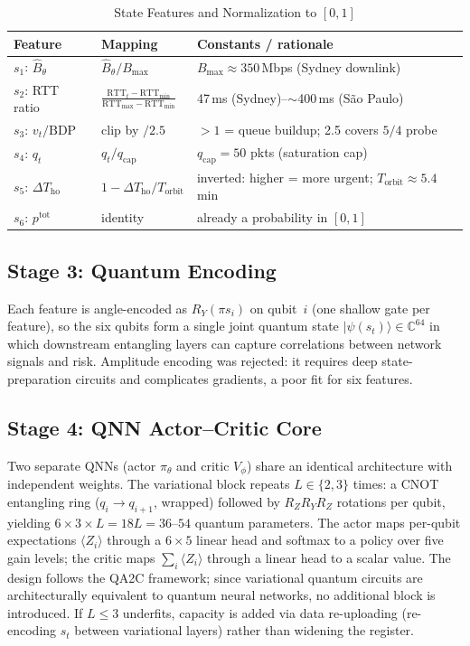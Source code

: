 \documentclass[journal]{IEEEtran}
\begin{document}
\begin{table}[!t]
\caption{State Features and Normalization to $[0,1]$}
\label{tab:norm}
\centering
\footnotesize
\begin{tabularx}{\columnwidth}{@{}llX@{}}
\toprule
Feature & Mapping & Constants / rationale \\
\midrule
$s_1$: $\hat{B}_\theta$ & $\hat{B}_\theta / B_{\max}$ &
  $B_{\max}\!\approx\!350$\,Mbps (Sydney downlink) \\
$s_2$: RTT ratio &
  $\frac{\mathrm{RTT}_t-\mathrm{RTT}_{\min}}{\mathrm{RTT}_{\max}-\mathrm{RTT}_{\min}}$ &
  47\,ms (Sydney)--$\sim$400\,ms (S\~{a}o Paulo) \\
$s_3$: $v_t/\mathrm{BDP}$ & clip by $/2.5$ &
  $>\!1$ = queue buildup; 2.5 covers $5/4$ probe \\
$s_4$: $q_t$ & $q_t / q_{\mathrm{cap}}$ &
  $q_{\mathrm{cap}}=50$ pkts (saturation cap) \\
$s_5$: $\Delta T_{\mathrm{ho}}$ &
  $1-\Delta T_{\mathrm{ho}}/T_{\mathrm{orbit}}$ &
  inverted: higher = more urgent; $T_{\mathrm{orbit}}\!\approx\!5.4$\,min \\
$s_6$: $p^{\mathrm{tot}}$ & identity &
  already a probability in $[0,1]$ \\
\bottomrule
\end{tabularx}
\end{table}

\subsection{Stage 3: Quantum Encoding}
Each feature is angle-encoded as $R_Y(\pi s_i)$ on qubit~$i$ (one shallow
gate per feature), so the six qubits form a single joint quantum state
$|\psi(s_t)\rangle\in\mathbb{C}^{64}$ in which downstream entangling layers
can capture correlations between network signals and risk. Amplitude
encoding was rejected: it requires deep state-preparation circuits and
complicates gradients, a poor fit for six features.

\subsection{Stage 4: QNN Actor--Critic Core}
Two separate QNNs (actor $\pi_\theta$ and critic $V_\phi$) share an
identical architecture with independent weights. The variational block
repeats $L\in\{2,3\}$ times: a CNOT entangling ring
($q_i{\to}q_{i+1}$, wrapped) followed by $R_Z R_Y R_Z$ rotations per qubit,
yielding $6\times 3\times L=18L=36$--$54$ quantum parameters. The actor
maps per-qubit expectations $\langle Z_i\rangle$ through a $6{\times}5$
linear head and softmax to a policy over five gain levels; the critic maps
$\sum_i\langle Z_i\rangle$ through a linear head to a scalar value. The
design follows the QA2C framework; since variational
quantum circuits are architecturally equivalent to quantum neural networks,
no additional block is introduced. If $L\le 3$ underfits, capacity is added
via data re-uploading (re-encoding $s_t$ between variational layers) rather
than widening the register.
\end{document}

